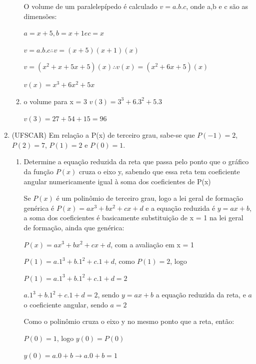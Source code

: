 \begin{multicols*}{2}
\begin{enumerate}[wide, labelwidth=!, labelindent=0pt]
\begin{enumerate}
                        O volume de um paralelepípedo é calculado $v = a.b.c$, onde a,b e c são as 								dimensões:

                        $a = x+5, b = x+1 e c = x$

                        $v = a.b.c \therefore v = (x+5)(x+1)(x)$

                        $v = (x^2 + x + 5x +5)(x) \therefore v(x) = (x^2 +6x +5)(x)$

                        $v(x) = x^3 + 6x^2 + 5x$
                  \item o volume para x = 3
                        $v(3) = 3^3 + 6.3^2 + 5.3$

                        $v(3) = 27 + 54 + 15 = 96$
              \end{enumerate}
        \item (UFSCAR) Em relação a P(x) de terceiro grau, sabe-se que $P(-1) = 2$, $P(2) = 7$,
              $P(1) = 2$ e	$P(0) = 1$.

              \begin{enumerate}

                  \item Determine a equação reduzida da reta que passa pelo ponto que o gráfico da função $P(x)$ 			cruza o eixo y, sabendo que essa reta tem coeficiente angular numericamente igual à soma dos 			coeficientes de P(x)

                        Se $P(x)$ é um polinômio de terceiro grau, logo a lei geral de formação genérica é
                        $P(x) = ax^3 + bx^2 + cx +d$ e a equação reduzida é $y = ax +b$, a soma dos coeficientes é 				basicamente substituição de x = 1 na lei geral de formação, ainda que genérica:

                        $P(x) = ax^3 + bx^2 + cx +d$, com a avaliação em x = 1

                        $P(1) = a.1^3 + b.1^2 + c.1 +d$, como $P(1) =  2$, logo

                        $P(1) = a.1^3 + b.1^2 + c.1 +d = 2$

                        $a.1^3 + b.1^2 + c.1 +d = 2$, sendo $y = ax +b$ a equação reduzida da reta, e $a$ o coeficiente 		angular, sendo $a = 2$

                        Como o polinômio cruza o eixo y no mesmo ponto que a reta, então:

                        $P(0) = 1$, logo $y(0) = P(0)$

                        $y(0) = a.0+b \rightarrow a.0 +b = 1$


\end{enumerate}
\end{enumerate}
\end{multicols*}
